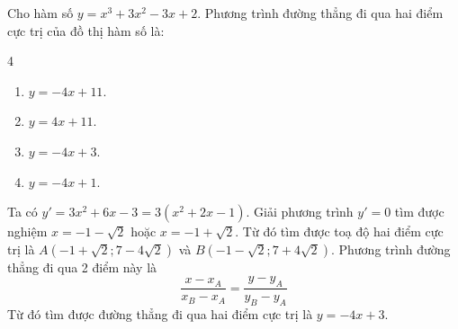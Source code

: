 \begin{baitap}
	Cho hàm số $y = x^3 + 3x^2 - 3x + 2$. Phương trình đường thẳng đi qua hai điểm cực trị của đồ thị hàm số là:
	\begin{multicols}{4}
		\begin{enumerate}
			\item $y = -4x + 11$.
			\item $y = 4x + 11$.
			\item $y = -4x + 3$.
			\item $y = -4x + 1$.
		\end{enumerate}
	\end{multicols}
	\begin{traloi}
		Ta có $y'=3x^2+6x-3=3(x^2+2x-1)$. Giải phương trình  $y'=0$ tìm được nghiệm $ x=-1-\sqrt{2}$ hoặc $x=-1+\sqrt{2}$.
		 Từ đó tìm được toạ độ hai điểm cực trị là $ A(-1+ \sqrt{2};7-4\sqrt{2}) $ và $ B(-1- \sqrt{2};7+4\sqrt{2}) $.  
		 Phương trình đường thẳng đi qua 2 điểm này là 
		 $$ \frac{x-x_A}{x_B-x_A}=\frac{y-y_A}{y_B-y_A} $$
		Từ đó tìm được đường thẳng đi qua hai điểm cực trị là $y=-4x+3$.
	\end{traloi}
\end{baitap}

